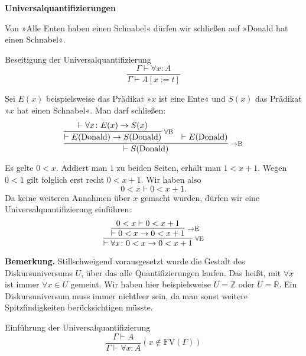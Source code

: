 \documentclass[8pt]{beamer}
\newcommand{\strong}[1]{\textsf{\textbf{#1}}}
\newcommand{\infernote}[1]{\!\text{\footnotesize #1}}
\newcommand{\centerheadline}[1]{%
  \begin{center}\strong{#1}\end{center}}
\newcommand{\cond}{\rightarrow}
\newcommand{\Z}{\mathbb Z}
\newcommand{\R}{\mathbb R}
\begin{document}
\begin{frame}
\centerheadline{Universalquantifizierungen}
\end{frame}

\begin{frame}
Von »Alle Enten haben einen Schnabel« dürfen wir schließen auf
»Donald hat einen Schnabel«.\pause
\begin{block}{Beseitigung der Universalquantifizierung}
\[\dfrac{\Gamma\vdash\forall x\colon A}{\Gamma\vdash A[x:=t]}\]
\end{block}\pause
Sei $E(x)$ beispielsweise das Prädikat »$x$ ist eine Ente« und $S(x)$
das Prädikat »$x$ hat einen Schnabel«. Man darf schließen:
\[
\infer[\infernote{$\cond$B}]{\vdash S(\text{Donald})}{
  \infer[\infernote{$\forall$B}]{\vdash E(\text{Donald})\cond S(\text{Donald})}{
    \vdash\forall x\colon E(x)\cond S(x)}
& \vdash E(\text{Donald})}
\]
\end{frame}

\begin{frame}
Es gelte $0<x$. Addiert man $1$ zu beiden Seiten,
erhält man $1<x+1$. Wegen $0<1$ gilt folglich erst recht
$0<x+1$. Wir haben also
\[0<x\vdash 0<x+1.\]\pause
Da keine weiteren Annahmen über $x$ gemacht wurden, dürfen
wir eine Universalquantifizierung einführen: 
\[
\infer[\infernote{$\forall$E}]{\vdash\forall x\colon 0<x\cond 0<x+1}{
  \infer[\infernote{$\cond$E}]{\vdash 0<x\cond 0<x+1}{
    0<x\vdash 0<x+1}}
\]\pause

\begin{footnotesize}
\strong{Bemerkung.} Stillschweigend vorausgesetzt wurde die Gestalt des
Diskursuniversums $U$, über das alle Quantifizierungen laufen. Das heißt,
mit $\forall x$ ist immer $\forall x\in U$ gemeint. Wir haben hier
beispielsweise $U=\Z$ oder $U=\R$. Ein Diskursuniversum muss immer
nichtleer sein, da man sonst weitere Spitzfindigkeiten berücksichtigen
müsste.
\end{footnotesize}
\end{frame}

\begin{frame}
\begin{block}{Einführung der Universalquantifizierung}
\[\dfrac{\Gamma\vdash A}{\Gamma\vdash\forall x\colon A}(x\notin\mathrm{FV}(\Gamma))\]
\end{block}
\end{frame}
\end{document}

